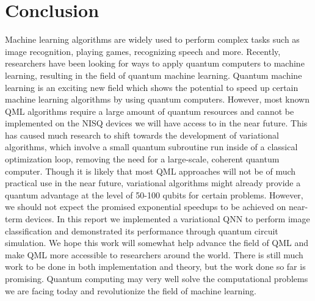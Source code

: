 \documentclass[a4paper,10pt]{article}
\begin{document}
\section{Conclusion} \label{sec:conclusion}
Machine learning algorithms are widely used to perform complex tasks such as image recognition, playing games, recognizing speech and more.
Recently, researchers have been looking for ways to apply quantum computers to machine learning, resulting in the field of quantum machine learning.
Quantum machine learning is an exciting new field which shows the potential to speed up certain machine learning algorithms by using quantum computers.
However, most known QML algorithms require a large amount of quantum resources and cannot be implemented on the NISQ devices we will have access to in the near future.
This has caused much research to shift towards the development of variational algorithms, which involve a small quantum subroutine run inside of a classical optimization loop, removing the need for a large-scale, coherent quantum computer. 
Though it is likely that most QML approaches will not be of much practical use in the near future, variational algorithms might already provide a quantum advantage at the level of 50-100 qubits for certain problems.
However, we should not expect the promised exponential speedups to be achieved on near-term devices.
In this report we implemented a variational QNN to perform image classification and demonstrated its performance through quantum circuit simulation.
We hope this work will somewhat help advance the field of QML and make QML more accessible to researchers around the world.
There is still much work to be done in both implementation and theory, but the work done so far is promising.
Quantum computing may very well solve the computational problems we are facing today and revolutionize the field of machine learning.

\clearpage

\printbibliography[heading=bibintoc]

\clearpage
\end{document}
